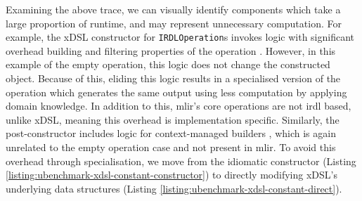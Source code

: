 Examining the above trace, we can visually identify components which take a large proportion of runtime, and may represent unnecessary computation.
For example, the xDSL constructor for \texttt{IRDLOperation}s invokes logic with significant overhead building and filtering properties of the operation . However, in this example of the empty operation, this logic does not change the constructed object. Because of this, eliding this logic results in a specialised version of the operation which generates the same output using less computation by applying domain knowledge.
In addition to this, \ac{mlir}'s core operations are not \ac{irdl} based, unlike xDSL, meaning this overhead is implementation specific.
Similarly, the post-constructor includes logic for context-managed builders , which is again unrelated to the empty operation case and not present in \ac{mlir}.
To avoid this overhead through specialisation, we move from the idiomatic constructor (Listing \ref{listing:ubenchmark-xdsl-constant-constructor}) to directly modifying xDSL's underlying data structures (Listing \ref{listing:ubenchmark-xdsl-constant-direct}).


